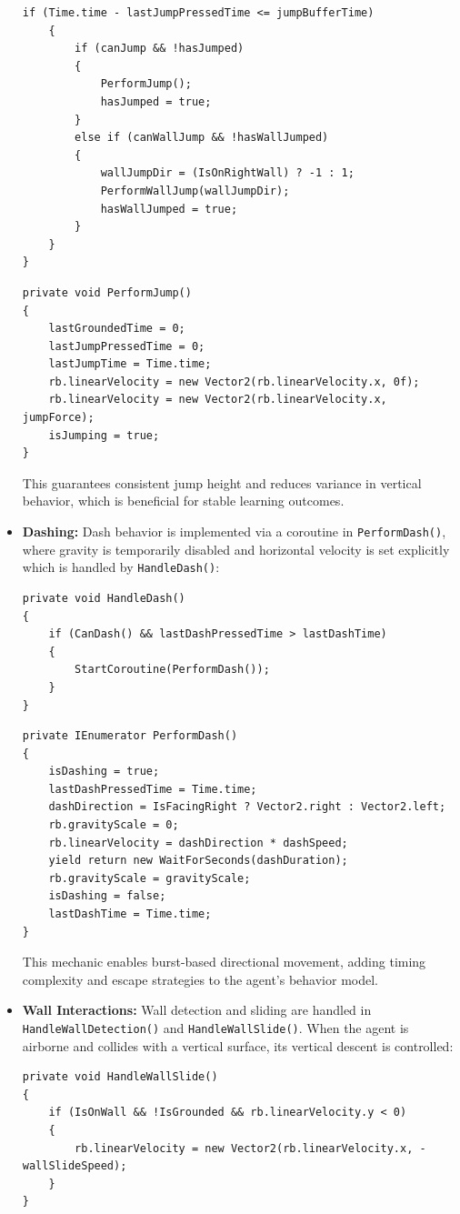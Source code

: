 \documentclass[12pt,oneside,openright,a4paper]{cpe-english-project}
\begin{document}
\begin{itemize}
\begin{lstlisting}[language={[Sharp]C}]
	if (Time.time - lastJumpPressedTime <= jumpBufferTime)
	{
		if (canJump && !hasJumped)
		{
			PerformJump();
			hasJumped = true;
		}
		else if (canWallJump && !hasWallJumped)
		{
			wallJumpDir = (IsOnRightWall) ? -1 : 1;
			PerformWallJump(wallJumpDir);
			hasWallJumped = true;
		}
	}
}
\end{lstlisting}
\begin{lstlisting}[language={[Sharp]C}]
private void PerformJump()
{
	lastGroundedTime = 0;
	lastJumpPressedTime = 0;
	lastJumpTime = Time.time;
	rb.linearVelocity = new Vector2(rb.linearVelocity.x, 0f);
	rb.linearVelocity = new Vector2(rb.linearVelocity.x, jumpForce);
	isJumping = true;
}
\end{lstlisting}
This guarantees consistent jump height and reduces variance in vertical behavior, which is beneficial for stable learning outcomes.
\item  \textbf{Dashing:} Dash behavior is implemented via a coroutine in \texttt{PerformDash()}, where gravity is temporarily disabled and horizontal velocity is set explicitly which is handled by \texttt{HandleDash()}:
\begin{lstlisting}[language={[Sharp]C}]
private void HandleDash()
{
	if (CanDash() && lastDashPressedTime > lastDashTime)
	{
		StartCoroutine(PerformDash());
	}
}
\end{lstlisting}
\begin{lstlisting}[language={[Sharp]C}]
private IEnumerator PerformDash()
{
	isDashing = true;
	lastDashPressedTime = Time.time;
	dashDirection = IsFacingRight ? Vector2.right : Vector2.left;
	rb.gravityScale = 0;
	rb.linearVelocity = dashDirection * dashSpeed;
	yield return new WaitForSeconds(dashDuration);
	rb.gravityScale = gravityScale;
	isDashing = false;
	lastDashTime = Time.time;
}
\end{lstlisting}
This mechanic enables burst-based directional movement, adding timing complexity and escape strategies to the agent’s behavior model.
\item  \textbf{Wall Interactions:} Wall detection and sliding are handled in \texttt{HandleWallDetection()} and \texttt{HandleWallSlide()}. When the agent is airborne and collides with a vertical surface, its vertical descent is controlled:

\begin{lstlisting}[language={[Sharp]C}]
private void HandleWallSlide()
{
	if (IsOnWall && !IsGrounded && rb.linearVelocity.y < 0)
	{
		rb.linearVelocity = new Vector2(rb.linearVelocity.x, -wallSlideSpeed);
	}
}
\end{lstlisting}


\end{itemize}
\end{document}
